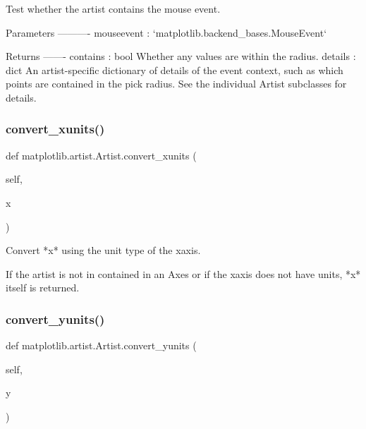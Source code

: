 \begin{DoxyVerb}Test whether the artist contains the mouse event.

Parameters
----------
mouseevent : `matplotlib.backend_bases.MouseEvent`

Returns
-------
contains : bool
    Whether any values are within the radius.
details : dict
    An artist-specific dictionary of details of the event context,
    such as which points are contained in the pick radius. See the
    individual Artist subclasses for details.
\end{DoxyVerb}
 \mbox{\label{classmatplotlib_1_1artist_1_1Artist_a77aa2acdfe80ad0031d4b434cd198967}} 
\subsubsection{\texorpdfstring{convert\+\_\+xunits()}{convert\_xunits()}}
{\footnotesize\ttfamily def matplotlib.\+artist.\+Artist.\+convert\+\_\+xunits (\begin{DoxyParamCaption}\item[{}]{self,  }\item[{}]{x }\end{DoxyParamCaption})}

\begin{DoxyVerb}Convert *x* using the unit type of the xaxis.

If the artist is not in contained in an Axes or if the xaxis does not
have units, *x* itself is returned.
\end{DoxyVerb}
 \mbox{\label{classmatplotlib_1_1artist_1_1Artist_a4cd38a5326740325a19be14a13492048}} 
\subsubsection{\texorpdfstring{convert\+\_\+yunits()}{convert\_yunits()}}
{\footnotesize\ttfamily def matplotlib.\+artist.\+Artist.\+convert\+\_\+yunits (\begin{DoxyParamCaption}\item[{}]{self,  }\item[{}]{y }\end{DoxyParamCaption})}

